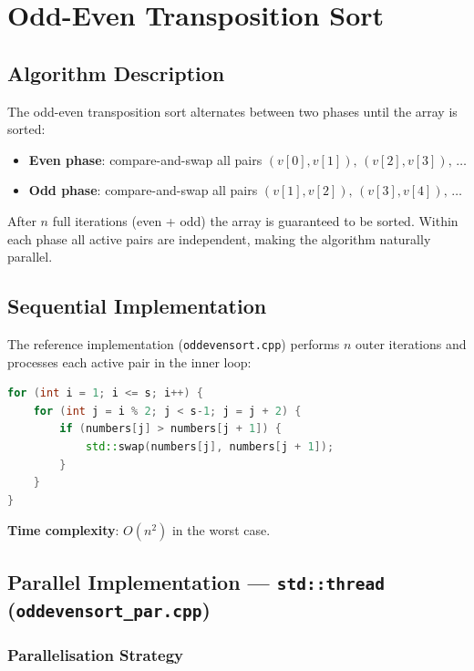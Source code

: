 \documentclass[11pt,a4paper]{article}
\begin{document}
\section{Odd-Even Transposition Sort}

\subsection{Algorithm Description}

The odd-even transposition sort alternates between two phases until the array is sorted:

\begin{itemize}
    \item \textbf{Even phase}: compare-and-swap all pairs $(v[0],v[1]),\,(v[2],v[3]),\,\ldots$
    \item \textbf{Odd phase}: compare-and-swap all pairs $(v[1],v[2]),\,(v[3],v[4]),\,\ldots$
\end{itemize}

After $n$ full iterations (even + odd) the array is guaranteed to be sorted.
Within each phase all active pairs are independent, making the algorithm naturally parallel.

\subsection{Sequential Implementation}

The reference implementation (\texttt{oddevensort.cpp}) performs $n$ outer iterations and
processes each active pair in the inner loop:

\begin{lstlisting}[language=C++, caption=Sequential Odd-Even Sort (core loop)]
for (int i = 1; i <= s; i++) {
    for (int j = i % 2; j < s-1; j = j + 2) {
        if (numbers[j] > numbers[j + 1]) {
            std::swap(numbers[j], numbers[j + 1]);
        }
    }
}
\end{lstlisting}

\textbf{Time complexity}: $O(n^2)$ in the worst case.

\subsection{Parallel Implementation --- \texttt{std::thread} (\texttt{oddevensort\_par.cpp})}

\subsubsection{Parallelisation Strategy}
\end{document}
